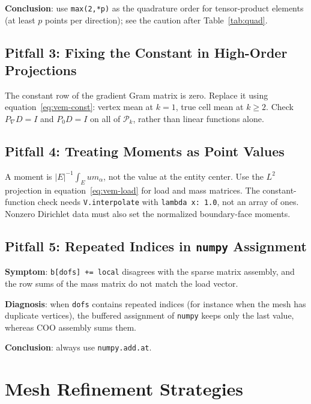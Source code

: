 \documentclass[11pt,oneside]{book}
\theoremstyle{definition}
\theoremstyle{plain}
\newcommand{\code}[1]{\texttt{#1}}
\begin{document}
\textbf{Conclusion}: use \code{max(2,*p)} as the quadrature order for
tensor-product elements (at least $p$ points per direction); see the caution after
Table~\ref{tab:quad}.

\subsection{Pitfall 3: Fixing the Constant in High-Order Projections}
The constant row of the gradient Gram matrix is zero. Replace it using
equation~\eqref{eq:vem-const}: vertex mean at $k=1$, true cell mean at $k\ge2$.
Check $P_\nabla D=I$ and $P_0D=I$ on all of $\mathcal P_k$, rather than linear functions alone.

\subsection{Pitfall 4: Treating Moments as Point Values}
A moment is $|E|^{-1}\int_Eu m_\alpha$, not the value at the entity center.
Use the $L^2$ projection in equation~\eqref{eq:vem-load} for load and mass matrices.
The constant-function check needs \code{V.interpolate} with \code{lambda x: 1.0}, not an array
of ones. Nonzero Dirichlet data must also set the normalized boundary-face moments.

\subsection{Pitfall 5: Repeated Indices in \code{numpy} Assignment}

\textbf{Symptom}: \code{b[dofs] += local} disagrees with the sparse matrix assembly,
and the row sums of the mass matrix do not match the load vector.

\textbf{Diagnosis}: when \code{dofs} contains repeated indices (for instance when
the mesh has duplicate vertices), the buffered assignment of \code{numpy} keeps only
the last value, whereas COO assembly sums them.

\textbf{Conclusion}: always use \code{numpy.add.at}.

\section{Mesh Refinement Strategies}
\end{document}
